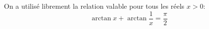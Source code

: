 \begin{enumerate}
On a utilisé librement la relation valable pour tous les réels $x>0$:
\begin{displaymath}
\arctan x + \arctan \frac{1}{x} = \frac{\pi}{2}
\end{displaymath}

\end{enumerate}
